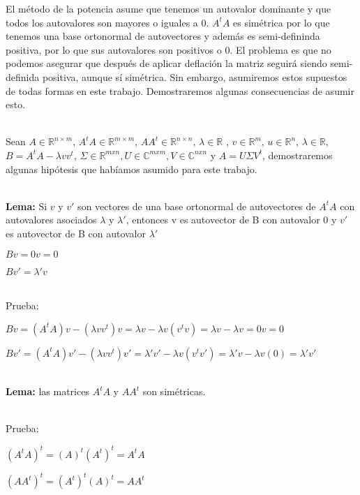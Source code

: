 El método de la potencia asume que tenemos un autovalor dominante y que todos los autovalores son
mayores o iguales a 0. $A^t A$ es simétrica por lo que tenemos una base ortonormal de autovectores
y además es semi-defininda positiva, por lo que sus autovalores son positivos o 0. El problema es
que no podemos asegurar que después de aplicar deflación la matriz seguirá siendo semi-definida
positiva, aunque sí simétrica. Sin embargo, asumiremos estos supuestos de todas formas en este
trabajo. Demostraremos algunas consecuencias de asumir esto.


\ \\

Sean $A \in \mathbb{R}^{n \times m}$, $A^t A \in \mathbb{R}^{m \times m}$, $A A^t \in \mathbb{R}^{n \times n}$, $\lambda \in \mathbb{R}$
, $v \in \mathbb{R}^m$, $u \in \mathbb{R}^n$, $\lambda \in \mathbb{R}$, $B = A^t A - \lambda v v^t$, $\Sigma \in \mathbb{R}^{mxn}, U \in \mathbb{C}^{mxm}, V \in
\mathbb{C}^{nxn}$ y $A = U \Sigma V^t$, demostraremos algunas hipótesis que habíamos asumido para
este trabajo.

\ \\
\textbf{Lema:} Si $v$ y $v'$ son vectores de una base ortonormal de autovectores de $A^t A$ con
autovalores asociados $\lambda$ y $\lambda'$, entonces v es autovector de B con autovalor 0 y $v'$
es autovector de B con autovalor $\lambda'$
\begin{compactitem}
  \item $B v = 0 v = 0$
  \item $B v' = \lambda' v$
\end{compactitem}

\ \\
Prueba:
\begin{center}
$B v =  (A^t A)v - (\lambda v v^t)v = \lambda v - \lambda v (v^t v) = \lambda v - \lambda v = 0 v =
0$

$B v' =  (A^t A)v' - (\lambda v v^t)v' = \lambda' v' - \lambda v (v^t v') = \lambda' v -
\lambda v (0) = \lambda' v'$
\end{center}


\ \\
\textbf{Lema:} las matrices $A^t A$ y $A A^t$ son simétricas.

\ \\
Prueba:

\begin{center}
  $(A^t A)^t = (A)^t (A^t)^t = A^t A$

  $(A A^t)^t = (A^t)^t (A)^t = A A^t$
\end{center}


